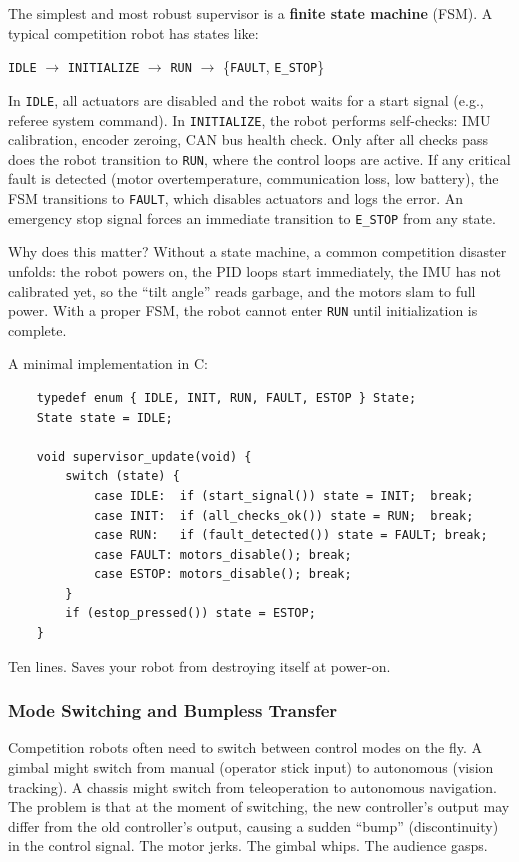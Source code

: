 The simplest and most robust supervisor is a \textbf{finite state machine} (FSM). A typical competition robot has states like:

\begin{center}
\texttt{IDLE} $\to$ \texttt{INITIALIZE} $\to$ \texttt{RUN} $\to$ \{\texttt{FAULT}, \texttt{E\_STOP}\}
\end{center}

In \texttt{IDLE}, all actuators are disabled and the robot waits for a start signal (e.g., referee system command). In \texttt{INITIALIZE}, the robot performs self-checks: IMU calibration, encoder zeroing, CAN bus health check. Only after all checks pass does the robot transition to \texttt{RUN}, where the control loops are active. If any critical fault is detected (motor overtemperature, communication loss, low battery), the FSM transitions to \texttt{FAULT}, which disables actuators and logs the error. An emergency stop signal forces an immediate transition to \texttt{E\_STOP} from any state.

Why does this matter? Without a state machine, a common competition disaster unfolds: the robot powers on, the PID loops start immediately, the IMU has not calibrated yet, so the ``tilt angle'' reads garbage, and the motors slam to full power. With a proper FSM, the robot cannot enter \texttt{RUN} until initialization is complete.

A minimal implementation in C:

\begin{verbatim}
    typedef enum { IDLE, INIT, RUN, FAULT, ESTOP } State;
    State state = IDLE;

    void supervisor_update(void) {
        switch (state) {
            case IDLE:  if (start_signal()) state = INIT;  break;
            case INIT:  if (all_checks_ok()) state = RUN;  break;
            case RUN:   if (fault_detected()) state = FAULT; break;
            case FAULT: motors_disable(); break;
            case ESTOP: motors_disable(); break;
        }
        if (estop_pressed()) state = ESTOP;
    }
\end{verbatim}

Ten lines. Saves your robot from destroying itself at power-on.

\subsubsection{Mode Switching and Bumpless Transfer}

Competition robots often need to switch between control modes on the fly. A gimbal might switch from manual (operator stick input) to autonomous (vision tracking). A chassis might switch from teleoperation to autonomous navigation. The problem is that at the moment of switching, the new controller's output may differ from the old controller's output, causing a sudden ``bump'' (discontinuity) in the control signal. The motor jerks. The gimbal whips. The audience gasps.

